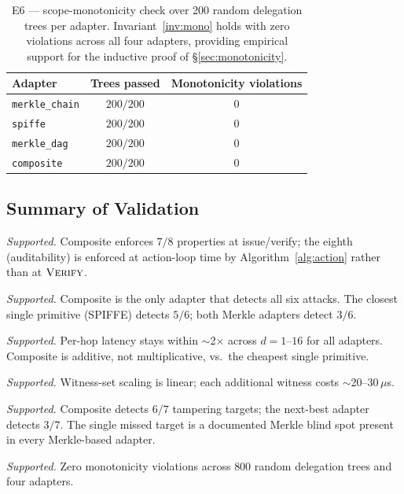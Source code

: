 \documentclass[11pt,a4paper]{article}
\begin{document}
\begin{table}[h]
\centering
\small
\caption{E6 --- scope-monotonicity check over 200 random delegation
trees per adapter. Invariant~\ref{inv:mono} holds with zero violations
across all four adapters, providing empirical support for the inductive
proof of \S\ref{sec:monotonicity}.}\label{tab:e6}
\begin{tabular}{lcc}
\toprule
Adapter & Trees passed & Monotonicity violations \\
\midrule
\texttt{merkle\_chain} & $200/200$ & $0$ \\
\texttt{spiffe}        & $200/200$ & $0$ \\
\texttt{merkle\_dag}   & $200/200$ & $0$ \\
\texttt{composite}     & $200/200$ & $0$ \\
\bottomrule
\end{tabular}
\end{table}

\subsection{Summary of Validation}\label{sec:val-summary}

\begin{description}[leftmargin=2em,style=nextline]
\item[H1.] \emph{Supported.} Composite enforces $7/8$ properties at
issue/verify; the eighth (auditability) is enforced at action-loop time
by Algorithm~\ref{alg:action} rather than at $\textsc{Verify}$.
\item[H2.] \emph{Supported.} Composite is the only adapter that detects
all six attacks. The closest single primitive (SPIFFE) detects $5/6$;
both Merkle adapters detect $3/6$.
\item[H3.] \emph{Supported.} Per-hop latency stays within
$\sim$2$\times$ across $d=1$--$16$ for all adapters. Composite is
additive, not multiplicative, vs.\ the cheapest single primitive.
\item[H4.] \emph{Supported.} Witness-set scaling is linear; each
additional witness costs $\sim$20--30$\,\mu$s.
\item[H5.] \emph{Supported.} Composite detects $6/7$ tampering targets;
the next-best adapter detects $3/7$. The single missed target is a
documented Merkle blind spot present in every Merkle-based adapter.
\item[H6.] \emph{Supported.} Zero monotonicity violations across $800$
random delegation trees and four adapters.
\end{description}
\end{document}
